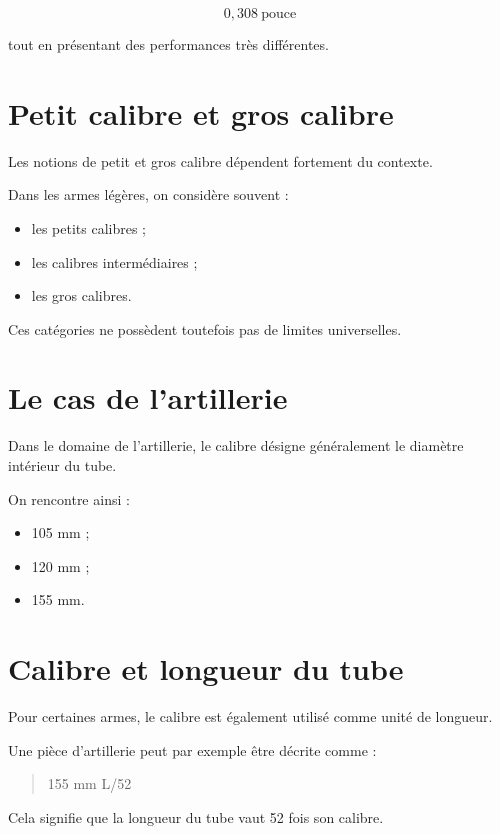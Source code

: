 \begin{equation}
0,308~\text{pouce}
\end{equation}

tout en présentant des performances très différentes.

\section{Petit calibre et gros calibre}

Les notions de petit et gros calibre dépendent fortement du contexte.

Dans les armes légères, on considère souvent :

\begin{itemize}
    \item les petits calibres ;
    \item les calibres intermédiaires ;
    \item les gros calibres.
\end{itemize}

Ces catégories ne possèdent toutefois pas de limites universelles.

\section{Le cas de l'artillerie}

Dans le domaine de l'artillerie, le calibre désigne généralement le diamètre
intérieur du tube.

On rencontre ainsi :

\begin{itemize}
    \item 105 mm ;
    \item 120 mm ;
    \item 155 mm.
\end{itemize}

\section{Calibre et longueur du tube}

Pour certaines armes, le calibre est également utilisé comme unité de
longueur.

Une pièce d'artillerie peut par exemple être décrite comme :

\begin{quote}
155 mm L/52
\end{quote}

Cela signifie que la longueur du tube vaut 52 fois son calibre.

